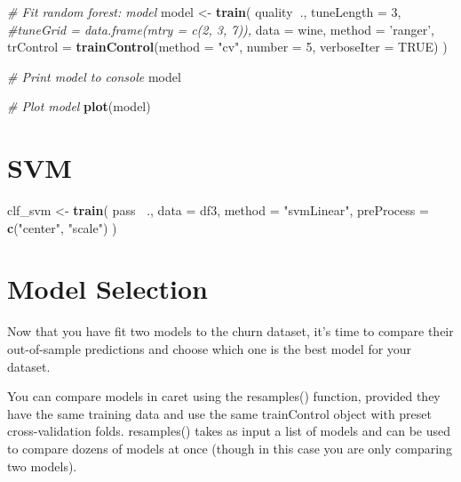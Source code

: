 \documentclass[]{book}
\newenvironment{Shaded}{\begin{snugshade}}{\end{snugshade}}
\newcommand{\KeywordTok}[1]{\textcolor[rgb]{0.13,0.29,0.53}{\textbf{#1}}}
\newcommand{\DataTypeTok}[1]{\textcolor[rgb]{0.13,0.29,0.53}{#1}}
\newcommand{\DecValTok}[1]{\textcolor[rgb]{0.00,0.00,0.81}{#1}}
\newcommand{\StringTok}[1]{\textcolor[rgb]{0.31,0.60,0.02}{#1}}
\newcommand{\CommentTok}[1]{\textcolor[rgb]{0.56,0.35,0.01}{\textit{#1}}}
\newcommand{\OtherTok}[1]{\textcolor[rgb]{0.56,0.35,0.01}{#1}}
\newcommand{\OperatorTok}[1]{\textcolor[rgb]{0.81,0.36,0.00}{\textbf{#1}}}
\newcommand{\NormalTok}[1]{#1}
\theoremstyle{definition}
\theoremstyle{definition}
\theoremstyle{definition}
\theoremstyle{remark}
\begin{document}
\begin{Shaded}
\begin{Highlighting}[]
\CommentTok{# Fit random forest: model}
\NormalTok{model <-}\StringTok{ }\KeywordTok{train}\NormalTok{(}
\NormalTok{  quality}\OperatorTok{~}\NormalTok{.,}
  \DataTypeTok{tuneLength =} \DecValTok{3}\NormalTok{,}
  \CommentTok{#tuneGrid = data.frame(mtry = c(2, 3, 7)),}
  \DataTypeTok{data =}\NormalTok{ wine, }
  \DataTypeTok{method =} \StringTok{'ranger'}\NormalTok{,}
  \DataTypeTok{trControl =} \KeywordTok{trainControl}\NormalTok{(}\DataTypeTok{method =} \StringTok{"cv"}\NormalTok{, }\DataTypeTok{number =} \DecValTok{5}\NormalTok{, }\DataTypeTok{verboseIter =} \OtherTok{TRUE}\NormalTok{)}
\NormalTok{)}

\CommentTok{# Print model to console}
\NormalTok{model}

\CommentTok{# Plot model}
\KeywordTok{plot}\NormalTok{(model)}
\end{Highlighting}
\end{Shaded}

\section{SVM}\label{svm-1}

\begin{Shaded}
\begin{Highlighting}[]
\NormalTok{clf_svm <-}\StringTok{ }\KeywordTok{train}\NormalTok{(}
\NormalTok{  pass }\OperatorTok{~}\NormalTok{., }
  \DataTypeTok{data =}\NormalTok{ df3, }
  \DataTypeTok{method =} \StringTok{"svmLinear"}\NormalTok{,}
  \DataTypeTok{preProcess =} \KeywordTok{c}\NormalTok{(}\StringTok{"center"}\NormalTok{, }\StringTok{"scale"}\NormalTok{)}
\NormalTok{                 )}
\end{Highlighting}
\end{Shaded}

\section{Model Selection}\label{model-selection-1}

Now that you have fit two models to the churn dataset, it's time to
compare their out-of-sample predictions and choose which one is the best
model for your dataset.

You can compare models in caret using the resamples() function, provided
they have the same training data and use the same trainControl object
with preset cross-validation folds. resamples() takes as input a list of
models and can be used to compare dozens of models at once (though in
this case you are only comparing two models).
\end{document}
